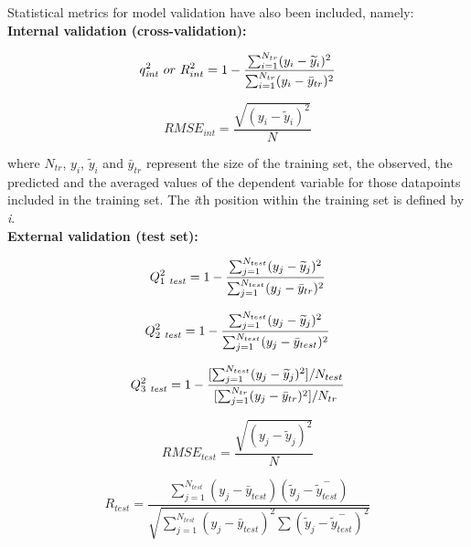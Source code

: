 \documentclass[twoside,a4wide,10pt]{article}
\begin{document}
Statistical metrics for model validation have also been included, namely:\\

{\bf Internal validation (cross-validation):}

\begin{equation}
q_{{\it int}}^{2} \ or \  R_{int}^{2}  = 1 - \frac {\sum_{i=1}^{N_{tr}} (y_{i} - \widetilde{y}_{i})^{2}} {\sum_{i=1}^{N_{tr}} (y_{i} - \bar{y}_{tr})^{2}}
\end{equation}

\begin{equation}
RMSE_{int} = \frac {\sqrt {(y_i - \widetilde{y}_i)^{2}}} {N}
\end{equation}

where $N_{tr}$, $y_i$, $\widetilde{y}_i$ and $\bar{y}_{tr}$ represent the size of the training set, the observed, the predicted and the averaged values of the dependent variable for those datapoints included in the training set. 
The {\it i}th position within the training set is defined by {\it i}.\\  

{\bf External validation (test set):}

\begin{equation}
Q_{1\ {\it test}}^{2} = 1 - \frac {\sum_{j=1}^{N_{test}} (y_j-\widetilde{y}_j)^{2}}  {\sum_{j=1}^{N_{test}} (y_j - \bar{y}_{tr})^{2}}
\end{equation}

\begin{equation}
Q_{2\ {\it test}}^{2} = 1 - \frac {\sum_{j=1}^{N_{test}} (y_j-\widetilde{y}_j)^{2}}  {\sum_{j=1}^{N_{test}} (y_j - \bar{y}_{test})^{2}}
\end{equation}

\begin{equation}
Q_{3\ {\it test}}^{2} = 1 - \frac {[\sum_{j=1}^{N_{test}} (y_j-\widetilde{y}_j)^{2}] / N_{test} }  {[ \sum_{j=1}^{N_{tr}} (y_j - \bar{y}_{tr})^{2}] / N_{tr}}
\end{equation}

\begin{equation}
RMSE_{test} = \frac {\sqrt {(y_j - \widetilde{y}_j)^{2}}} {N} 
\end{equation}

\begin{equation}
R_{test} = \frac {{\sum_{j=1}^{N_{test}} (y_{j} - \bar{y}_{test})}  (\widetilde{y}_{j} - \overset{-}{\widetilde{y}_{test}})} 
{\sqrt{\sum_{j=1}^{N_{test}} (y_{j} - \bar{y}_{test})^{2} \sum{ (\widetilde{y}_{j} - \overset{-}{\widetilde{y}_{test}})^{2}}}}
\end{equation}
\end{document}
